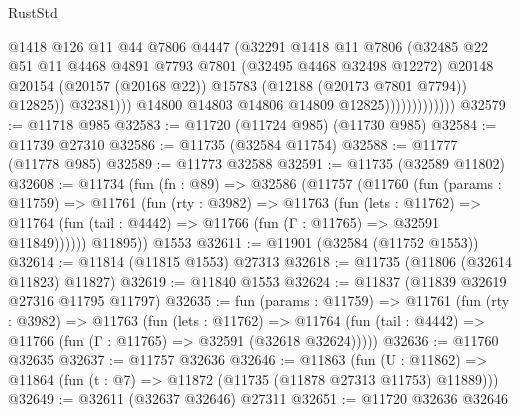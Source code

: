 \begin{lexlean}{RustStd}
\begin{coremodule}
                                    @1418
                                    @126
                                    @11
                                    @44
                                    @7806
                                    @4447
                                    (@32291
                                      @1418
                                      @11
                                      @7806
                                      (@32485
                                        @22
                                        @51
                                        @11
                                        @4468
                                        @4891
                                        @7793
                                        @7801
                                        (@32495 @4468 @32498 @12272)
                                        @20148
                                        @20154
                                        (@20157 (@20168 @22))
                                        @15783
                                        (@12188 (@20173 @7801 @7794))
                                        @12825))
                                    @32381)))
                              @14800
                              @14803
                              @14806
                              @14809
                              @12825)))))))))))))
@32579 := @11718 @985
@32583 := @11720 (@11724 @985) (@11730 @985)
@32584 := @11739 @27310
@32586 := @11735 (@32584 @11754)
@32588 := @11777 (@11778 @985)
@32589 := @11773 @32588
@32591 := @11735 (@32589 @11802)
@32608 := @11734
    (fun (fn : @89) =>
    @32586
      (@11757
        (@11760
          (fun (params : @11759) =>
          @11761
            (fun (rty : @3982) =>
            @11763
              (fun (lets : @11762) =>
              @11764 (fun (tail : @4442) => @11766 (fun (Γ : @11765) => @32591 @11849))))))
        @11895))
    @1553
@32611 := @11901 (@32584 (@11752 @1553))
@32614 := @11814 (@11815 @1553) @27313
@32618 := @11735 (@11806 (@32614 @11823) @11827)
@32619 := @11840 @1553
@32624 := @11837 (@11839 @32619 @27316 @11795 @11797)
@32635 := fun (params : @11759) =>
  @11761
    (fun (rty : @3982) =>
    @11763
      (fun (lets : @11762) =>
      @11764 (fun (tail : @4442) => @11766 (fun (Γ : @11765) => @32591 (@32618 @32624)))))
@32636 := @11760 @32635
@32637 := @11757 @32636
@32646 := @11863
    (fun (U : @11862) => @11864 (fun (t : @7) => @11872 (@11735 (@11878 @27313 @11753) @11889)))
@32649 := @32611 (@32637 @32646) @27311
@32651 := @11720 @32636 @32646

\end{coremodule}
\end{lexlean}
